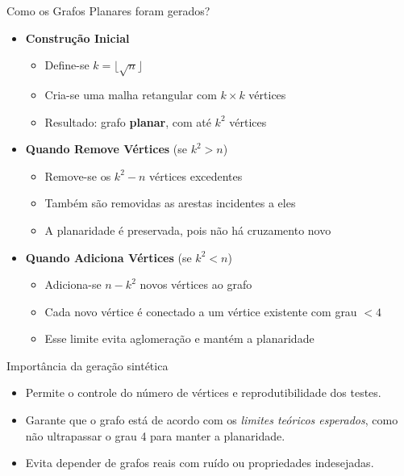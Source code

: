 \begin{frame}{Como os Grafos Planares foram gerados?}
\begin{itemize}
    \item \textbf{Construção Inicial}
    \begin{itemize}
        \item Define-se \( k = \lfloor \sqrt{n} \rfloor \)
        \item Cria-se uma malha retangular com \( k \times k \) vértices
        \item Resultado: grafo \textbf{planar}, com até \( k^2 \) vértices
    \end{itemize}

    \item \textbf{Quando Remove Vértices} \hfill (se \( k^2 > n \))
    \begin{itemize}
        \item Remove-se os \( k^2 - n \) vértices excedentes
        \item Também são removidas as arestas incidentes a eles
        \item A planaridade é preservada, pois não há cruzamento novo
    \end{itemize}

    \item \textbf{Quando Adiciona Vértices} \hfill (se \( k^2 < n \))
    \begin{itemize}
        \item Adiciona-se \( n - k^2 \) novos vértices ao grafo
        \item Cada novo vértice é conectado a um vértice existente com grau \( < 4 \)
        \item Esse limite evita aglomeração e mantém a planaridade
    \end{itemize}
\end{itemize}
\end{frame}

\begin{frame}{Importância da geração sintética}
    \begin{itemize}
        \item Permite o controle do número de vértices e reprodutibilidade dos testes.
        
        \item Garante que o grafo está de acordo com os \textit{limites teóricos esperados}, como não ultrapassar o grau 4 para manter a planaridade.
        
        \item Evita depender de grafos reais com ruído ou propriedades indesejadas.
    \end{itemize}
\end{frame}

